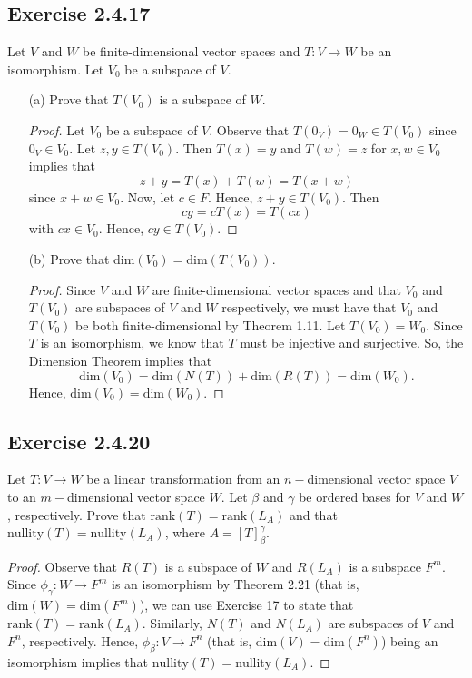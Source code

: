 \subsection*{Exercise 2.4.17} Let \( V  \) and \( W  \) be finite-dimensional vector spaces and \( T: V \to W  \) be an isomorphism. Let \( {V}_{0} \) be a subspace of \( V  \).
\begin{enumerate}
    \item[(a)] Prove that \( T({V}_{0})  \) is a subspace of \( W  \).
        \begin{proof}
            Let \( {V}_{0}  \) be a subspace of \( V \). Observe that \( T({0}_{V}) = {0}_{W} \in T({V}_{0}) \) since \( {0}_{V} \in {V}_{0} \). Let \( z,y \in T({V}_{0}) \). Then \( T(x) = y  \) and \( T(w) = z  \) for \( x,w \in {V}_{0}  \) implies that
            \[  z + y = T(x) + T(w) = T(x+w) \]
            since \( x+w \in {V}_{0} \). Now, let \( c \in F  \). Hence, \( z + y \in T({V}_{0}) \). Then 
            \[  cy = cT(x) = T(cx) \]
            with \( cx \in {V}_{0} \). Hence, \( cy \in T({V}_{0})\).
        \end{proof}
    \item[(b)] Prove that \( \text{dim}({V}_{0}) = \text{dim}(T({V}_{0})) \).
        \begin{proof} Since \( V  \) and \( W  \) are finite-dimensional vector spaces and that \( {V}_{0} \) and \( T({V}_{0}) \) are subspaces of \( V  \) and \( W  \) respectively, we must have that \( {V}_{0}\) and \( T({V}_{0}) \) be both finite-dimensional by Theorem 1.11. Let \( T({V}_{0}) = {W}_{0} \). Since \( T  \) is an isomorphism, we know that \( T \) must be injective and surjective. So, the Dimension Theorem implies that   
        \[ \text{dim}({V}_{0}) = \text{dim}(N(T)) + \text{dim}(R(T)) = \text{dim}({W}_{0}).\]
        Hence, \( \text{dim}({V}_{0}) = \text{dim}({W}_{0}) \).
        \end{proof}
\end{enumerate}

\subsection*{Exercise 2.4.20} Let \( T: V \to W  \) be a linear transformation from an \( n- \)dimensional vector space \( V  \) to an \( m- \)dimensional vector space \( W  \). Let \( \beta  \) and \( \gamma  \) be ordered bases for \( V  \) and \( W  \), respectively. Prove that \( \text{rank}(T) = \text{rank}({L}_{A}) \) and that \( \text{nullity}(T) = \text{nullity}({L}_{A}) \), where \( A = [T]_{\beta}^{\gamma}  \). 
\begin{proof}
    Observe that \( R(T)  \) is a subspace of \( W  \) and \( R({L}_{A})  \) is a subspace \( F^{m} \). Since \( {\phi}_{\gamma}: W \to F^{m} \) is an isomorphism by Theorem 2.21 (that is, \( \text{dim}(W) = \text{dim}(F^{m}) \)), we can use Exercise 17 to state that \( \text{rank}(T) = \text{rank}({L}_{A}) \). Similarly, \( N(T)  \) and \( N({L}_{A}) \) are subspaces of \( V  \) and \( F^{n} \), respectively. Hence, \( {\phi}_{\beta}: V \to F^{n} \) (that is, \( \text{dim}(V) = \text{dim}(F^{n}) \)) being an isomorphism implies that \( \text{nullity}(T) = \text{nullity}({L}_{A})\). 
\end{proof}

